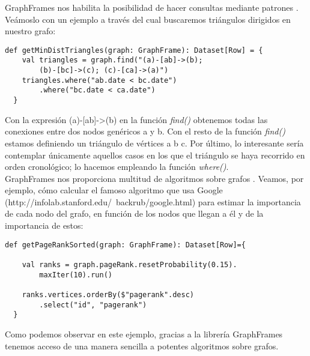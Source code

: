 GraphFrames nos habilita la posibilidad de hacer consultas mediante patrones \cite{motif}. Veámoslo con un ejemplo a través del cual buscaremos triángulos dirigidos en nuestro grafo:\\

\begin{lstlisting}[frame=single]
  def getMinDistTriangles(graph: GraphFrame): Dataset[Row] = {
    val triangles = graph.find("(a)-[ab]->(b); 
    	(b)-[bc]->(c); (c)-[ca]->(a)")
    triangles.where("ab.date < bc.date")
    	.where("bc.date < ca.date")
  }
\end{lstlisting}

Con la expresión (a)-[ab]->(b) en la función \textit{find()} obtenemos todas las conexiones entre dos nodos genéricos a y b. Con el resto de la función \textit{find()} estamos definiendo un triángulo de vértices a b c.  Por último, lo interesante sería contemplar únicamente aquellos casos en los que el triángulo se haya recorrido en orden cronológico; lo hacemos empleando la función \textit{where()}.\\

GraphFrames nos proporciona multitud de algoritmos sobre grafos \cite{graphFramesGuide}. Veamos, por ejemplo, cómo calcular el famoso algoritmo que usa Google (http://infolab.stanford.edu/~backrub/google.html) para estimar la importancia de cada nodo del grafo, en función de los nodos que llegan a él y de la importancia de estos:\\

\begin{lstlisting}[frame=single]
  def getPageRankSorted(graph: GraphFrame): Dataset[Row]={

    val ranks = graph.pageRank.resetProbability(0.15).
    	maxIter(10).run()

	ranks.vertices.orderBy($"pagerank".desc)
		.select("id", "pagerank")
  }
\end{lstlisting}

Como podemos observar en este ejemplo, gracias a la librería GraphFrames tenemos acceso de una manera sencilla a potentes algoritmos sobre grafos.\\
